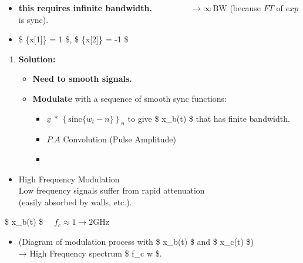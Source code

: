 \documentclass[11pt]{article}
\providecommand{\tightlist}{%
      \setlength{\itemsep}{0pt}\setlength{\parskip}{0pt}}
\begin{document}
{\begin{itemize}
\tightlist
\item
  \textbf{this requires infinite bandwidth.} \(\qquad \qquad\)
  \(\to \infty \, \text{BW}\) (because \(F T\) of \(exp\) is sync).
\item
  \$ \{x{[}1{]}\} = 1 \$, \$ \{x{[}2{]}\} = -1
  \$
\end{itemize}

\begin{enumerate}
\def\labelenumi{\arabic{enumi}.}
\setcounter{enumi}{4}
\tightlist
\item
  \textbf{Solution:}

  \begin{itemize}
  \tightlist
  \item
    \textbf{Need to smooth signals.}
  \item
    \textbf{Modulate} with a sequence of smooth sync functions:

    \begin{itemize}
    \tightlist
    \item
      \(\underline{x} \, \ast \, \left\{ \text{sinc}\{w_t  -n\}\right\}_n\)
      to give \$ x\_b(t) \$ that has finite bandwidth.
    \item
      \(P.A\) Convolution (Pulse Amplitude)
    \item
    \end{itemize}
  \end{itemize}
\end{enumerate}

\begin{itemize}
\tightlist
\item
  High Frequency Modulation\\
  Low frequency signals suffer from rapid attenuation\\
  (easily absorbed by walls, etc.).
\end{itemize}

\$ x\_b(t) \xrightarrow{\qquad \qquad }  \xrightarrow{\qquad }  \$
\(\quad f_c \approx 1 \to 2 \text{GHz}\)

\begin{itemize}
\tightlist
\item
  (Diagram of modulation process with \$ x\_b(t) \$ and \$ x\_c(t) \$)\\
  → High Frequency spectrum \$ f\_c \pm w \$.
\end{itemize}

}
\end{document}
